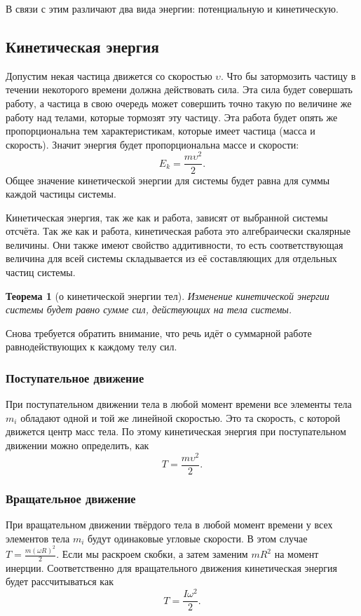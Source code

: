 \documentclass[10pt]{extbook}
\newtheorem{theorem}{Теорема}[section]
\begin{document}
В связи с этим различают два вида энергии: потенциальную и кинетическую.

\subsection{Кинетическая энергия}

Допустим некая частица движется со скоростью $\upsilon$. Что бы затормозить
частицу в течении некоторого времени должна действовать сила. Эта сила будет
совершать работу, а частица в свою очередь может совершить точно такую по
величине же работу над телами, которые тормозят эту частицу. Эта работа будет
опять же пропорциональна тем характеристикам, которые имеет частица (масса и
скорость). Значит энергия будет пропорциональна массе и скорости: \[
	E_k = \frac{m \upsilon^2}{2}
	.\] Общее значение кинетической энергии для системы будет равна для суммы каждой частицы системы.

Кинетическая энергия, так же как и работа, зависят от выбранной системы
отсчёта. Так же как и работа, кинетическая работа это алгебраически скалярные
величины. Они также имеют свойство аддитивности, то есть соответствующая
величина для всей системы складывается из её составляющих для отдельных частиц
системы.

\begin{theorem}[о кинетической энергии тел]
	Изменение кинетической энергии системы будет равно сумме сил, действующих на
	тела системы.
\end{theorem}

Снова требуется обратить внимание, что речь идёт о суммарной работе
равнодействующих к каждому телу сил.

\subsubsection{Поступательное движение}
При поступательном движении тела в любой момент времени все элементы тела $m_i$
обладают одной и той же линейной скоростью. Это та скорость, с которой движется
центр масс тела. По этому кинетическая энергия при поступательном движении
можно определить, как \[
	T = \frac{m \upsilon^2}{2}
	.\]

\subsubsection{Вращательное движение}
При вращательном движении твёрдого тела в любой момент времени у всех элементов
тела $m_i$ будут одинаковые угловые скорости. В этом случае \( T = \frac{m
	(\omega R)^2}{2} \). Если мы раскроем скобки, а затем заменим \( m R^2 \) на
момент инерции. Соответственно для вращательного движения кинетическая энергия
будет рассчитываться как \[
	T = \frac{I \omega^2}{2}
	.\]
\end{document}
